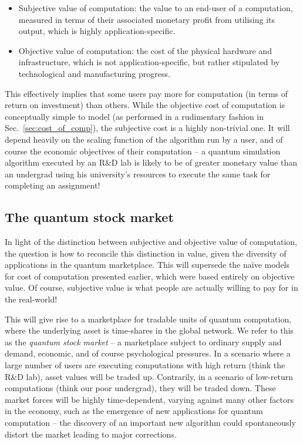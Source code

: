 \begin{itemize}
\item Subjective value of computation: the value to an end-user of a computation, measured in terms of their associated monetary profit from utilising its output, which is highly application-specific.
\item Objective value of computation: the cost of the physical hardware and infrastructure, which is not application-specific, but rather stipulated by technological and manufacturing progress.
\end{itemize}

This effectively implies that some users pay more for computation (in terms of return on investment) than others. While the objective cost of computation is conceptually simple to model (as performed in a rudimentary fashion in Sec.~\ref{sec:cost_of_comp}), the subjective cost is a highly non-trivial one. It will depend heavily on the scaling function of the algorithm run by a user, and of course the economic objectives of their computation -- a quantum simulation algorithm executed by an R\&D lab is likely to be of greater monetary value than an undergrad using his university's resources to execute the same task for completing an assignment!

%
%

\subsection{The quantum stock market}

In light of the distinction between subjective and objective value of computation, the question  is how to reconcile this distinction in value, given the diversity of applications in the quantum marketplace. This will supersede the na\"ive models for cost of computation presented earlier, which were based entirely on objective value. Of course, subjective value is what people are actually willing to pay for in the real-world!

This will give rise to a marketplace for tradable units of quantum computation, where the underlying asset is time-shares in the global network. We refer to this as the \textit{quantum stock market} -- a marketplace subject to ordinary supply and demand, economic, and of course psychological pressures. In a scenario where a large number of users are executing computations with high return (think the R\&D lab), asset values will be traded up. Contrarily, in a scenario of low-return computations (think our poor undergrad), they will be traded down. These market forces will be highly time-dependent, varying against many other factors in the economy, such as the emergence of new applications for quantum computation -- the discovery of an important new algorithm could spontaneously distort the market leading to major corrections.

